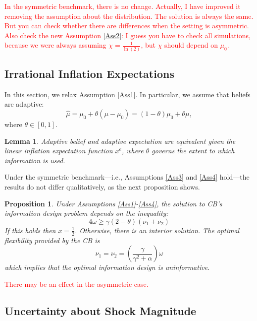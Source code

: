 \documentclass[12pt,a4paper]{article}
\newtheorem{proposition}{Proposition}
\newtheorem{lemma}{Lemma}
\begin{document}
\textcolor{red}{In the symmetric benchmark, there is no change. Actually, I have improved it removing the assumption about the distribution. The solution is always the same. But you can check whether there are differences when the setting is asymmetric. Also check the new Assumption \ref{Ass2}: I guess you have to check all simulations, because we were always assuming $\chi=\frac{1}{\ln(2)}$, but $\chi$ should depend on $\mu_0$.}

\subsection{Irrational Inflation Expectations}
In this section, we relax Assumption \ref{Ass1}. In particular, we assume that beliefs are adaptive: 
$$\hat{\mu} = \mu_0 + \theta (\mu-\mu_0) = (1-\theta)\mu_0 + \theta \mu,$$
where $\theta\in[0,1]$.
\begin{lemma}
\label{adaptive}
    Adaptive belief and adaptive expectation are equivalent given the linear inflation expectation function $x^e$, where $\theta$ governs the extent to which information is used.
\end{lemma}

Under the symmetric benchmark---i.e., Assumptions \ref{Ass3} and \ref{Ass4} hold---the results do not differ qualitatively, as the next proposition shows.

\begin{proposition}
    \label{Prop4}
    Under Assumptions \ref{Ass1}-\ref{Ass4}, the solution to CB's information design problem depends on the inequality:
    \begin{equation}
    \label{threshold2}
        4\omega\geq\gamma(2-\theta)(\nu_1+\nu_2)
    \end{equation}
    If this holds then $x=\frac{1}{2}$. Otherwise, there is an interior solution. 
    The optimal flexibility provided by the CB is
    \begin{equation}
        \nu_1=\nu_2=\left(\frac{\gamma}{\gamma^2+\alpha}\right)\omega
    \end{equation}
    which implies that the optimal information design is uninformative.
\end{proposition}

\textcolor{red}{There may be an effect in the asymmetric case.}



\subsection{Uncertainty about Shock Magnitude}
\end{document}

